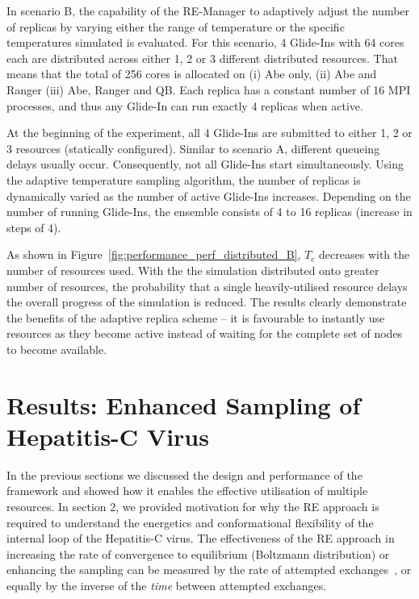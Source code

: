 \documentclass{rspublic}
\begin{document}
In scenario B, the capability of the RE-Manager to adaptively adjust
the number of replicas by varying either the
range of temperature or the specific temperatures simulated is
evaluated.  For this scenario, 4 Glide-Ins with 64 cores each
are distributed across either 1, 2 or 3 different distributed
resources. That means that the total of 256 cores is allocated on (i)
Abe only, (ii) Abe and Ranger (iii) Abe, Ranger and QB.
Each replica has a constant number of 16 MPI processes, and thus any
Glide-In can run exactly 4 replicas when active.

At the beginning of the experiment, all 4 Glide-Ins are submitted to
either 1, 2 or 3 resources (statically configured).  Similar to
scenario A, different queueing delays usually occur.
Consequently, not all Glide-Ins start
simultaneously.  Using the adaptive temperature sampling algorithm,
the number of replicas is dynamically varied as the number of active
Glide-Ins increases. Depending on the number of running Glide-Ins, the
ensemble consists of 4 to 16 replicas (increase in
steps of 4).


As shown in Figure~\ref{fig:performance_perf_distributed_B}, $T_{c}$
decreases with the number of resources used.  With the the simulation
distributed onto greater number of resources, the probability that a
single heavily-utilised resource delays the overall progress of the
simulation is reduced.
The results clearly demonstrate the benefits of the adaptive replica
scheme -- it is favourable to instantly use resources as they become
active instead of waiting for the complete set of nodes to become
available.  

\section{Results: Enhanced Sampling of Hepatitis-C Virus}
In the previous sections we discussed the design and performance of
the framework and showed how it enables the effective utilisation of
multiple resources. In section 2, we provided motivation for why the
RE approach is required to understand the energetics and
conformational flexibility of the internal loop of the Hepatitis-C
virus. The effectiveness of the RE approach in increasing the rate of
convergence to equilibrium (Boltzmann distribution) or enhancing the
sampling can be measured by the rate of attempted
exchanges~\citep{Lei:2007xe}, or equally by the inverse of the {\it
  time} between attempted exchanges.
\end{document}
